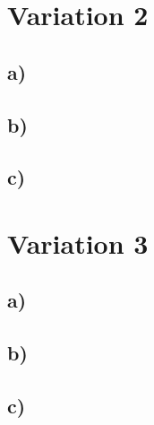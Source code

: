 \documentclass[a4paper, 11pt]{article}
\begin{document}

\section{Variation 2} %
\label{sec:variation_2}

\subsection{a)} %


\subsection{b)} %


\subsection{c)} %



\section{Variation 3} %
\label{sec:variation_3}

\subsection{a)} %


\subsection{b)} %


\subsection{c)} %


\end{document}
